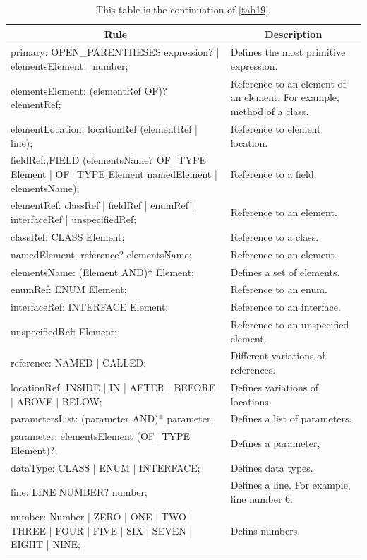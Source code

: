 \begin{table}[H]
	\centering
	\begin{tabular}{|p{8cm}|p{7cm}|}
		\hline
		\multicolumn{1}{|c|}{{\bf Rule}} & \multicolumn{1}{c|}{{\bf Description}} \\ \hline
		primary: OPEN\_PARENTHESES expression? | elementsElement | number; & Defines the most primitive expression. \\ \hline
		elementsElement: (elementRef OF)? elementRef; & Reference to an element of an element. For example, method of a class. \\ \hline
		elementLocation: locationRef (elementRef | line); & Reference to element location. \\ \hline
		fieldRef:,FIELD (elementsName? OF\_TYPE Element | OF\_TYPE Element namedElement | elementsName); & Reference to a field. \\ \hline
		elementRef: classRef | fieldRef | enumRef | interfaceRef | unspecifiedRef; & Reference to an element. \\ \hline
		classRef: CLASS Element; & Reference to a class. \\ \hline
		namedElement: reference? elementsName; & Reference to an element. \\ \hline
		elementsName: (Element AND)* Element; & Defines a set of elements. \\ \hline
		enumRef: ENUM Element; & Reference to an enum. \\ \hline
		interfaceRef: INTERFACE Element; & Reference to an interface. \\ \hline
		unspecifiedRef: Element; & Reference to an unspecified element. \\ \hline
		reference: NAMED | CALLED; & Different variations of references. \\ \hline
		locationRef: INSIDE | IN | AFTER | BEFORE | ABOVE | BELOW; & Defines variations of locations. \\ \hline
		parametersList: (parameter AND)* parameter; & Defines a list of parameters. \\ \hline
		parameter: elementsElement (OF\_TYPE Element)?; & Defines a parameter, \\ \hline
		dataType: CLASS | ENUM | INTERFACE; & Defines data types. \\ \hline
		line: LINE NUMBER? number; & Defines a line. For example, line number 6. \\ \hline
		number: Number | ZERO | ONE | TWO | THREE | FOUR | FIVE | SIX | SEVEN | EIGHT | NINE; & Defins numbers. \\ \hline
	\end{tabular}
	\caption{This table is the continuation of \autoref{tab19}.}
	\label{tab20}
\end{table}

